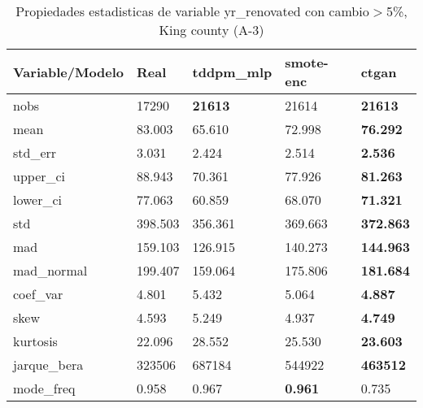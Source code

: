 \begin{table}[H]
\centering
\fontsize{8}{14}\selectfont
\caption{Propiedades estadisticas de variable yr\_renovated con cambio\ensuremath{>}5\%, King county (A-3)}
\label{table-stats-king county-a-3-yr_renovated-short}
\begin{tabular}{|l|m{10em}|m{10em}|m{10em}|m{10em}|}
\hline
 \rowcolor[gray]{0.8}
Variable/Modelo & Real & tddpm\_mlp & smote-enc & ctgan \\
\hline nobs & 17290 & \bfseries 21613 & \cellcolor[rgb]{0.9, 0.54, 0.52} 21614 & \bfseries 21613 \\
\hline mean & 83.003 & \cellcolor[rgb]{0.9, 0.54, 0.52} 65.610 & 72.998 & \bfseries 76.292 \\
\hline std\_err & 3.031 & \cellcolor[rgb]{0.9, 0.54, 0.52} 2.424 & 2.514 & \bfseries 2.536 \\
\hline upper\_ci & 88.943 & \cellcolor[rgb]{0.9, 0.54, 0.52} 70.361 & 77.926 & \bfseries 81.263 \\
\hline lower\_ci & 77.063 & \cellcolor[rgb]{0.9, 0.54, 0.52} 60.859 & 68.070 & \bfseries 71.321 \\
\hline std & 398.503 & \cellcolor[rgb]{0.9, 0.54, 0.52} 356.361 & 369.663 & \bfseries 372.863 \\
\hline mad & 159.103 & \cellcolor[rgb]{0.9, 0.54, 0.52} 126.915 & 140.273 & \bfseries 144.963 \\
\hline mad\_normal & 199.407 & \cellcolor[rgb]{0.9, 0.54, 0.52} 159.064 & 175.806 & \bfseries 181.684 \\
\hline coef\_var & 4.801 & \cellcolor[rgb]{0.9, 0.54, 0.52} 5.432 & 5.064 & \bfseries 4.887 \\
\hline skew & 4.593 & \cellcolor[rgb]{0.9, 0.54, 0.52} 5.249 & 4.937 & \bfseries 4.749 \\
\hline kurtosis & 22.096 & \cellcolor[rgb]{0.9, 0.54, 0.52} 28.552 & 25.530 & \bfseries 23.603 \\
\hline jarque\_bera & 323506 & \cellcolor[rgb]{0.9, 0.54, 0.52} 687184 & 544922 & \bfseries 463512 \\
\hline mode\_freq & 0.958 & 0.967 & \bfseries 0.961 & \cellcolor[rgb]{0.9, 0.54, 0.52} 0.735 \\
\hline
\end{tabular}
\end{table}
